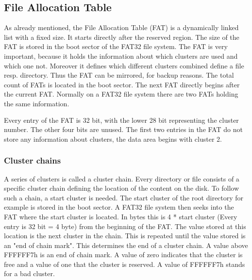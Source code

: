 \subsection{File Allocation Table}

As already mentioned, the File Allocation Table (FAT) is a dynamically linked list with a fixed size. It starts directly after the reserved region. The size of the FAT is stored in the boot sector of the FAT32 file system. The FAT is very important, because it holds the information about which clusters are used and which one not. Moreover it defines which different clusters combined define a file resp. directory. Thus the FAT can be mirrored, for backup reasons. The total count of FATs is located in the boot sector. The next FAT directly begins after the current FAT. Normally on a FAT32 file system there are two FATs holding the same information.

Every entry of the FAT is 32 bit, with the lower 28 bit representing the cluster number. The other four bits are unused. The first two entries in the FAT do not store any information about clusters, the data area begins with cluster 2\cite{usb_ms_jan}.

\subsubsection{Cluster chains}

A series of clusters is called a cluster chain. Every directory or file consists of a specific cluster chain defining the location of the content on the disk. To follow such a chain, a start cluster is needed. The start cluster of the root directory for example is stored in the boot sector. A FAT32 file system then seeks into the FAT where the start cluster is located. In bytes this is 4 * start cluster (Every entry is 32 bit = 4 byte) from the beginning of the FAT. The value stored at this location is the next cluster in the chain. This is repeated until the value stored is an "end of chain mark". This determines the end of a cluster chain. A value above FFFFFF7h is an end of chain mark. A value of zero indicates that the cluster is free and a value of one that the cluster is reserved. A value of FFFFFF7h stands for a bad cluster.

